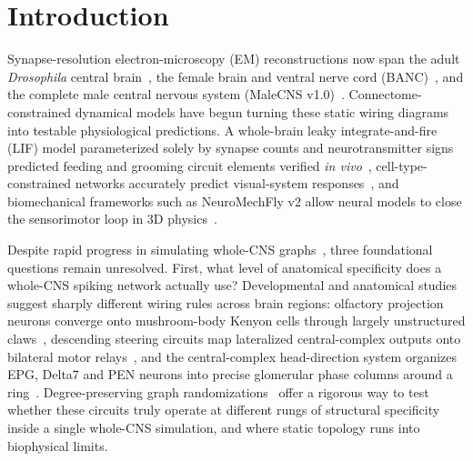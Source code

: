 \documentclass[11pt,a4paper]{article}
\begin{document}
\begin{abstract}
\emph{fru}/\emph{dsx} subgraphs strictly within each connectome symmetrically double-dissociates male courtship song and sensory gating and female vpoDN receptivity from shared navigation circuitry.

\end{abstract}
\section{Introduction}
Synapse-resolution electron-microscopy (EM) reconstructions now span the adult \emph{Drosophila} central brain~\cite{dorkenwald2024neuronal,schlegel2024whole}, the female brain and ventral nerve cord (BANC)~\cite{bates2025banc}, and the complete male central nervous system (MaleCNS v1.0)~\cite{berg2026sexual}. Connectome-constrained dynamical models have begun turning these static wiring diagrams into testable physiological predictions. A whole-brain leaky integrate-and-fire (LIF) model parameterized solely by synapse counts and neurotransmitter signs predicted feeding and grooming circuit elements verified \emph{in vivo}~\cite{shiu2024drosophila}, cell-type-constrained networks accurately predict visual-system responses~\cite{lappalainen2024connectome}, and biomechanical frameworks such as NeuroMechFly v2 allow neural models to close the sensorimotor loop in 3D physics~\cite{wangchen2024neuromechfly}.

Despite rapid progress in simulating whole-CNS graphs~\cite{annel0flybrain}, three foundational questions remain unresolved. First, what level of anatomical specificity does a whole-CNS spiking network actually use? Developmental and anatomical studies suggest sharply different wiring rules across brain regions: olfactory projection neurons converge onto mushroom-body Kenyon cells through largely unstructured claws~\cite{caron2013random,aso2014neuronal}, descending steering circuits map lateralized central-complex outputs onto bilateral motor relays~\cite{westeinde2024transforming,rayshubskiy2025steering}, and the central-complex head-direction system organizes EPG, Delta7 and PEN neurons into precise glomerular phase columns around a ring~\cite{seelig2015neural,turnerevans2020ring,hulse2021connectome}. Degree-preserving graph randomizations~\cite{maslov2002specificity} offer a rigorous way to test whether these circuits truly operate at different rungs of structural specificity inside a single whole-CNS simulation, and where static topology runs into biophysical limits.
\end{document}
